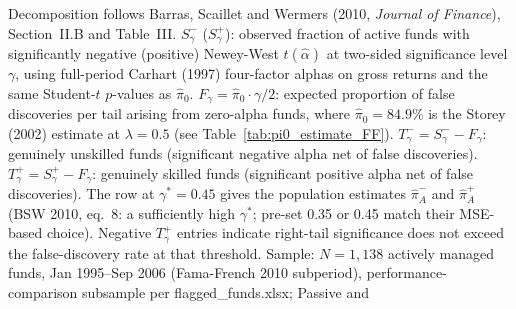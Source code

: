 \begin{table}[!htbp]
\begin{minipage}{\tabletempwidth}
\begin{singlespace}
Decomposition follows Barras, Scaillet and Wermers (2010, \textit{Journal of Finance}), Section~II.B and Table~III. $S^-_\gamma$ ($S^+_\gamma$): observed fraction of active funds with significantly negative (positive) Newey-West $t(\hat{\alpha})$ at two-sided significance level $\gamma$, using full-period Carhart (1997) four-factor alphas on gross returns and the same Student-$t$ $p$-values as $\hat{\pi}_0$. $F_\gamma = \hat{\pi}_0 \cdot \gamma/2$: expected proportion of false discoveries per tail arising from zero-alpha funds, where $\hat{\pi}_0 = 84.9\%$ is the Storey (2002) estimate at $\lambda = 0.5$ (see Table~\ref{tab:pi0_estimate_FF}). $T^-_\gamma = S^-_\gamma - F_\gamma$: genuinely unskilled funds (significant negative alpha net of false discoveries). $T^+_\gamma = S^+_\gamma - F_\gamma$: genuinely skilled funds (significant positive alpha net of false discoveries). The row at $\gamma^* = 0.45$ gives the population estimates $\hat{\pi}^-_A$ and $\hat{\pi}^+_A$ (BSW 2010, eq.~8: a sufficiently high $\gamma^*$; pre-set 0.35 or 0.45 match their MSE-based choice). Negative $T^+_\gamma$ entries indicate right-tail significance does not exceed the false-discovery rate at that threshold. Sample: $N = 1{,}138$ actively managed funds, Jan 1995--Sep 2006 (Fama-French 2010 subperiod), performance-comparison subsample per flagged\_funds.xlsx; Passive and
\end{singlespace}
\end{minipage}
\end{table}

